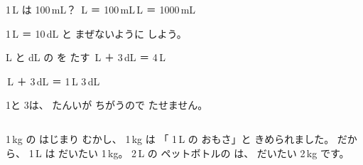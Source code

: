 \begin{tsumazuki}{1\,L は 100\,mL？}
\bkbatsu{}\,L ＝ 100\,mL\hspace{3\zw}\bkmaru{}\,L ＝ 1000\,mL\par
1\,L ＝ 10\,dL と まぜないように しよう。
\end{tsumazuki}

\begin{tsumazuki}{L と dL の を たす}
\bkbatsu{}\,L ＋ 3\,dL ＝ 4\,L\par
\bkmaru{}\,L ＋ 3\,dL ＝ 1\,L 3\,dL\par
1と 3は、 たんいが ちがうので たせません。
\end{tsumazuki}

\begin{column}{1\,kg の はじまり}
むかし、 1\,kg は 「 1\,L の おもさ」と きめられました。 だから、  1\,L は だいたい 1\,kg。 2\,L の ペットボトルの は、 だいたい 2\,kg です。
\end{column}

